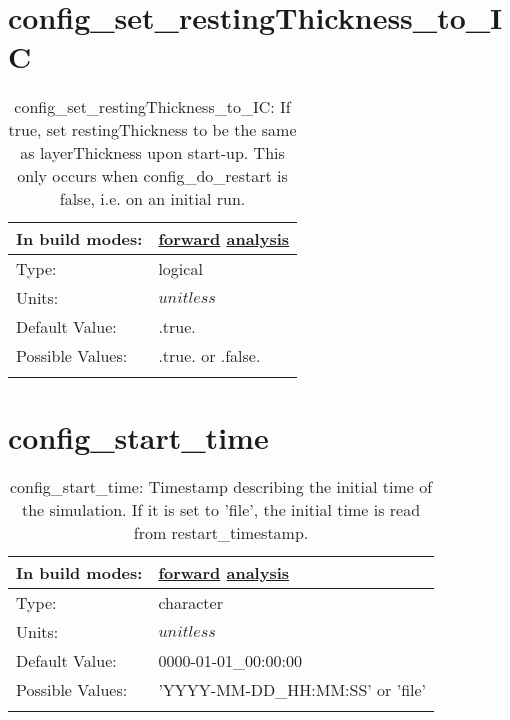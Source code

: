 \section[config\_set\_restingThickness\_to\_IC]{config\_set\_restingThickness\_to\_IC}
\label{sec:nm_sec_config_set_restingThickness_to_IC}
\begin{center}
\begin{longtable}{| p{2.0in} || p{4.0in} |}
    \hline
    In build modes: & \hyperref[subsec:forward_nm_tab_ALE_vertical_grid]{forward} \hyperref[subsec:analysis_nm_tab_ALE_vertical_grid]{analysis} \\
    \hline
    Type: & logical \\
    \hline
    Units: & $unitless$ \\
    \hline
    Default Value: & .true. \\
    \hline
    Possible Values: & .true. or .false. \\
    \hline
    \caption{config\_set\_restingThickness\_to\_IC: If true, set restingThickness to be the same as layerThickness upon start-up.  This only occurs when config\_do\_restart is false, i.e. on an initial run.}
\end{longtable}
\end{center}
\section[config\_start\_time]{config\_start\_time}
\label{sec:nm_sec_config_start_time}
\begin{center}
\begin{longtable}{| p{2.0in} || p{4.0in} |}
    \hline
    In build modes: & \hyperref[subsec:forward_nm_tab_time_management]{forward} \hyperref[subsec:analysis_nm_tab_time_management]{analysis} \\
    \hline
    Type: & character \\
    \hline
    Units: & $unitless$ \\
    \hline
    Default Value: & 0000-01-01\_00:00:00 \\
    \hline
    Possible Values: & 'YYYY-MM-DD\_HH:MM:SS' or 'file' \\
    \hline
    \caption{config\_start\_time: Timestamp describing the initial time of the simulation. If it is set to 'file', the initial time is read from restart\_timestamp.}
\end{longtable}
\end{center}
